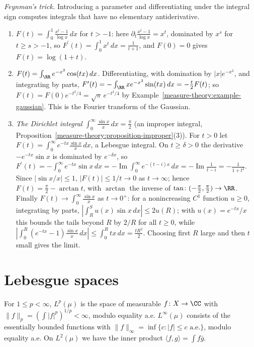 \begin{example}\label{measure-theory:example-feynman}
\emph{Feynman's trick.} Introducing a parameter and differentiating under the integral sign computes integrals that have no elementary antiderivative.
\begin{enumerate}
\item $F(t) = \int_0^1\frac{x^t - 1}{\log x}\,dx$ for $t > -1$: here $\partial_t\frac{x^t - 1}{\log x} = x^t$, dominated by $x^{s}$ for $t \geq s > -1$, so $F^{\prime}(t) = \int_0^1x^t\,dx = \frac{1}{t + 1}$, and
$F(0) = 0$ gives $F(t) = \log(1 + t)$.
\item $F(t) = \int_\RR e^{-x^2}\cos(tx)\,dx$. Differentiating, with domination by $|x|e^{-x^2}$, and integrating by parts,
$F^{\prime}(t) = -\int_\RR xe^{-x^2}\sin(tx)\,dx = -\frac t2F(t)$; so $F(t) = F(0)e^{-t^2/4} = \sqrt\pi\,e^{-t^2/4}$ by Example~\ref{measure-theory:example-gaussian}. This is the Fourier transform of the
Gaussian.
\item \emph{The Dirichlet integral} $\int_0^\infty\frac{\sin x}{x}\,dx = \frac\pi2$ (an improper integral, Proposition~\ref{measure-theory:proposition-improper}(3)). For $t > 0$ let
$F(t) = \int_0^\infty e^{-tx}\frac{\sin x}{x}\,dx$, a Lebesgue integral. On $t \geq \delta > 0$ the derivative $-e^{-tx}\sin x$ is dominated by $e^{-\delta x}$, so
$F^{\prime}(t) = -\int_0^\infty e^{-tx}\sin x\,dx = -\operatorname{Im}\int_0^\infty e^{-(t - i)x}\,dx = -\operatorname{Im}\frac{1}{t - i} = -\frac{1}{1 + t^2}$. Since $|\sin x/x| \leq 1$,
$|F(t)| \leq 1/t \to 0$ as $t \to \infty$; hence $F(t) = \frac\pi2 - \arctan t$, with $\arctan$ the inverse of $\tan \colon (-\frac\pi2, \frac\pi2) \to \RR$. Finally $F(t) \to \int_0^\infty\frac{\sin x}x$ as
$t \to 0^+$: for a nonincreasing $C^1$ function $u \geq 0$, integrating by parts, $|\int_R^Su(x)\sin x\,dx| \leq 2u(R)$; with $u(x) = e^{-tx}/x$ this bounds the tails beyond $R$ by $2/R$ for all
$t \geq 0$, while $|\int_0^R(e^{-tx} - 1)\frac{\sin x}{x}\,dx| \leq \int_0^Rtx\,dx = \frac{tR^2}2$. Choosing first $R$ large and then $t$ small gives the limit.
\end{enumerate}
\end{example}

\section{Lebesgue spaces}\label{measure-theory:section-lp}

\begin{definition}\label{measure-theory:definition-lp}
For $1 \leq p < \infty$, $L^p(\mu)$ is the space of measurable $f \colon X \to \CC$ with $\|f\|_p = (\int|f|^p)^{1/p} < \infty$, modulo equality a.e. $L^\infty(\mu)$ consists of the essentially bounded
functions with $\|f\|_\infty = \inf\{c : |f| \leq c \text{ a.e.}\}$, modulo equality a.e. On $L^2(\mu)$ we have the inner product $\langle f, g \rangle = \int f\bar g$.
\end{definition}

